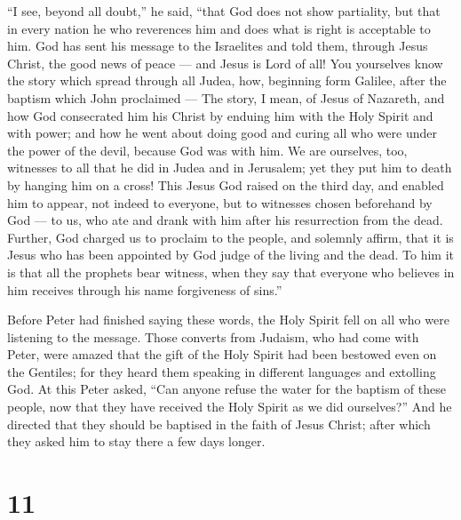 ``I see, beyond all doubt,'' he said, ``that God does not show
partiality,  but that in every nation he who reverences him
and does what is right is acceptable to him.  God has sent
his message to the Israelites and told them, through Jesus Christ, the
good news of peace --- and Jesus is Lord of all!  You
yourselves know the story which spread through all Judea, how, beginning
form Galilee, after the baptism which John proclaimed --- 
The story, I mean, of Jesus of Nazareth, and how God consecrated him his
Christ by enduing him with the Holy Spirit and with power; and how he
went about doing good and curing all who were under the power of the
devil, because God was with him.  We are ourselves, too,
witnesses to all that he did in Judea and in Jerusalem; yet they put him
to death by hanging him on a cross!  This Jesus God raised
on the third day, and enabled him to appear,  not indeed to
everyone, but to witnesses chosen beforehand by God --- to us, who ate
and drank with him after his resurrection from the dead. 
Further, God charged us to proclaim to the people, and solemnly affirm,
that it is Jesus who has been appointed by God judge of the living and
the dead.  To him it is that all the prophets bear witness,
when they say that everyone who believes in him receives through his
name forgiveness of sins.''

 Before Peter had finished saying these words, the Holy
Spirit fell on all who were listening to the message. 
Those converts from Judaism, who had come with Peter, were amazed that
the gift of the Holy Spirit had been bestowed even on the Gentiles;
 for they heard them speaking in different languages and
extolling God. At this Peter asked,  ``Can anyone refuse
the water for the baptism of these people, now that they have received
the Holy Spirit as we did ourselves?''  And he directed
that they should be baptised in the faith of Jesus Christ; after which
they asked him to stay there a few days longer.

\hypertarget{section-10}{%
\section{11}\label{section-10}}


